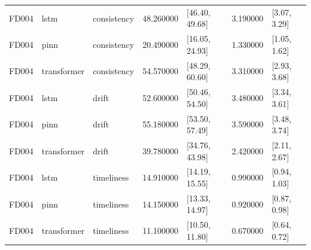 \begin{table}
\begin{tabular}{lllrlrl}
FD004 & lstm & consistency & 48.260000 & [46.40, 49.68] & 3.190000 & [3.07, 3.29] \\
FD004 & pinn & consistency & 20.490000 & [16.05, 24.93] & 1.330000 & [1.05, 1.62] \\
FD004 & transformer & consistency & 54.570000 & [48.29, 60.60] & 3.310000 & [2.93, 3.68] \\
FD004 & lstm & drift & 52.600000 & [50.46, 54.50] & 3.480000 & [3.34, 3.61] \\
FD004 & pinn & drift & 55.180000 & [53.50, 57.49] & 3.590000 & [3.48, 3.74] \\
FD004 & transformer & drift & 39.780000 & [34.76, 43.98] & 2.420000 & [2.11, 2.67] \\
FD004 & lstm & timeliness & 14.910000 & [14.19, 15.55] & 0.990000 & [0.94, 1.03] \\
FD004 & pinn & timeliness & 14.150000 & [13.33, 14.97] & 0.920000 & [0.87, 0.98] \\
FD004 & transformer & timeliness & 11.100000 & [10.50, 11.80] & 0.670000 & [0.64, 0.72] \\
\bottomrule
\end{tabular}
\end{table}
